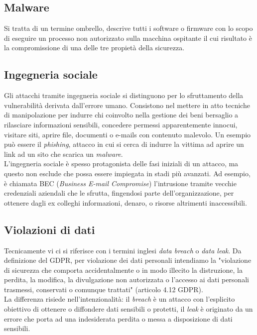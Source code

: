 \documentclass[12pt,a4paper,openright,twoside]{report}
\begin{document}
\subsection{Malware}
Si tratta di un termine ombrello, descrive tutti i software o firmware con lo scopo di eseguire un processo non autorizzato sulla macchina ospitante il cui risultato \`e la compromissione di una delle tre propiet\`a della sicurezza.\\
\subsection{Ingegneria sociale}
Gli attacchi tramite ingegneria sociale si distinguono per lo sfruttamento della vulnerabilit\`a derivata dall'errore umano. Consistono nel mettere in atto tecniche di manipolazione per indurre chi coinvolto nella gestione dei beni bersaglio a rilasciare informazioni sensibili, concedere permessi 
apparentemente innocui, visitare siti, aprire file, documenti o e-mails con contenuto malevolo. Un esempio pu\`o essere il \textit{phishing}, attacco in cui si cerca di indurre la vittima ad aprire un link ad un sito che scarica un \textit{malware}.\\
L'ingegneria sociale \`e spesso protagonista delle fasi iniziali di un attacco, ma questo non esclude che possa essere impiegata in stadi pi\`u avanzati. Ad esempio, \`e chiamata BEC (\textit{Business E-mail Compromise}) l'intrusione tramite vecchie credenziali aziendali che le sfrutta, fingendosi parte dell'organizzazione, per ottenere dagli ex colleghi informazioni, denaro, o risorse altrimenti inaccessibili.\cite{IBM_BEC}\\

\subsection{Violazioni di dati}
Tecnicamente vi ci si riferisce con i termini inglesi \textit{data breach} o \textit{data leak}.  
Da definizione del GDPR, per violazione dei dati personali intendiamo la "violazione di sicurezza che comporta accidentalmente o in modo illecito la distruzione, la perdita, la modifica, la divulgazione non autorizzata o l'accesso ai dati personali trasmessi, conservati o comunque trattati" (articolo 4.12 GDPR). \\
La differenza risiede nell'intenzionalità: il \textit{breach} \`e un attacco con l'esplicito obiettivo di ottenere o diffondere dati sensibili o protetti, il \textit{leak} è originato da un errore che porta ad una indesiderata perdita o messa a disposizione di dati sensibili. \\
\end{document}
